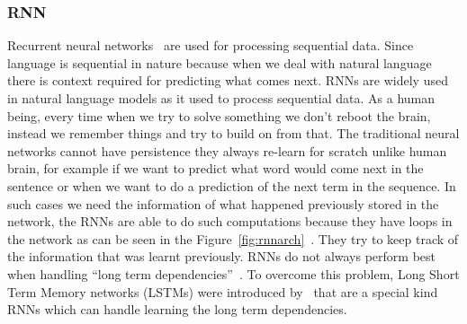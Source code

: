 \subsubsection{RNN}
Recurrent neural networks~\cite{rumelhart1988learning} are used for processing sequential data. Since language is sequential in nature because when we deal with natural language there is context required for predicting what comes next. RNNs are widely used in natural language models as it used to process sequential data.
As a human being, every time when we try to solve something we don't reboot the brain, instead we remember things and try to build on from that. The traditional neural networks cannot have persistence they always re-learn for scratch unlike human brain, for example if we want to predict what word would come next in the sentence or when we want to do a prediction of the next term in the sequence. In such cases we need the information of what happened previously stored in the network, the RNNs are able to do such computations because they have loops in the network as can be seen in the Figure~\ref{fig:rnnarch}~\cite{chung2015recurrent}. They try to keep track of the information that was learnt previously. 
RNNs do not always perform best when handling ``long term dependencies''~\cite{bengio1994learning}. To overcome this problem, Long Short Term Memory networks (LSTMs) were introduced by~\cite{hochreiter1997long} that are a special kind RNNs which can handle learning the long term dependencies. 

